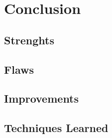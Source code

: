 \documentclass[a4paper,12pt]{article}
\numberwithin{equation}{section} %
\numberwithin{figure}{section}
\begin{document}
%

\section{Conclusion}

\subsection{Strenghts}

\subsection{Flaws}

\subsection{Improvements}

\subsection{Techniques Learned}
\nocite{*} %

\end{document}

